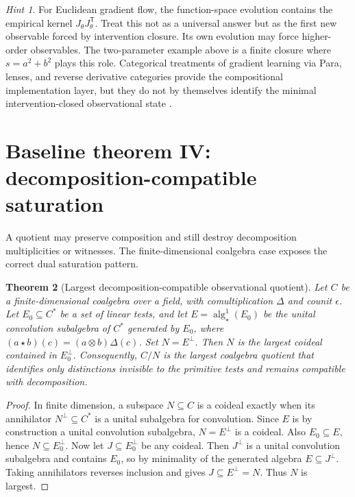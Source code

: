\documentclass[11pt]{article}
\newtheorem{theorem}{Theorem}[section]
\theoremstyle{definition}
\theoremstyle{remark}
\newtheorem{hint}[theorem]{Hint}
\begin{document}
\begin{hint}
For Euclidean gradient flow, the function-space evolution contains the empirical kernel $J_\theta J_\theta^{\mathsf T}$. Treat this not as a universal answer but as the first new observable forced by intervention closure. Its own evolution may force higher-order observables. The two-parameter example above is a finite closure where $s=a^2+b^2$ plays this role. Categorical treatments of gradient learning via Para, lenses, and reverse derivative categories provide the compositional implementation layer, but they do not by themselves identify the minimal intervention-closed observational state \cite{Gradient2022}.
\end{hint}

\section{Baseline theorem IV: decomposition-compatible saturation}

A quotient may preserve composition and still destroy decomposition multiplicities or witnesses. The finite-dimensional coalgebra case exposes the correct dual saturation pattern.

\begin{theorem}[Largest decomposition-compatible observational quotient]
Let $C$ be a finite-dimensional coalgebra over a field, with comultiplication $\Delta$ and counit $\epsilon$. Let $E_0\subseteq C^*$ be a set of linear tests, and let $E=\operatorname{alg}^{1}_{\star}(E_0)$ be the unital convolution subalgebra of $C^*$ generated by $E_0$, where $(a\star b)(c)=(a\otimes b)\Delta(c)$. Set $N=E^{\perp}$. Then $N$ is the largest coideal contained in $E_0^{\perp}$. Consequently, $C/N$ is the largest coalgebra quotient that identifies only distinctions invisible to the primitive tests and remains compatible with decomposition.
\end{theorem}

\begin{proof}
In finite dimension, a subspace $N\subseteq C$ is a coideal exactly when its annihilator $N^{\perp}\subseteq C^*$ is a unital subalgebra for convolution. Since $E$ is by construction a unital convolution subalgebra, $N=E^{\perp}$ is a coideal. Also $E_0\subseteq E$, hence $N\subseteq E_0^{\perp}$. Now let $J\subseteq E_0^{\perp}$ be any coideal. Then $J^{\perp}$ is a unital convolution subalgebra and contains $E_0$, so by minimality of the generated algebra $E\subseteq J^{\perp}$. Taking annihilators reverses inclusion and gives $J\subseteq E^{\perp}=N$. Thus $N$ is largest.
\end{proof}
\end{document}
